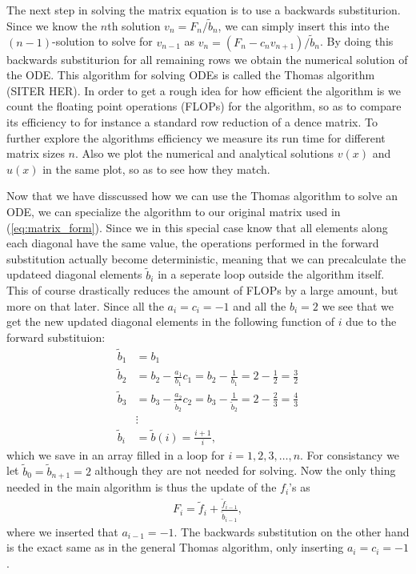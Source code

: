 \documentclass[twocolumn]{aastex62}
\begin{document}
The next step in solving the matrix equation is to use a backwards substiturion. Since we know the $n$th solution $v_n = F_n/\tilde{b}_n$, we can simply insert this into the $(n-1)$-solution to solve for $v_{n-1}$ as $v_{n} = (F_{n} - c_{n}v_{n+1})/ \tilde{b}_{n}$. By doing this backwards substiturion for all remaining rows we obtain the numerical solution of the ODE. This algorithm for solving ODEs is called the Thomas algorithm (SITER HER). In order to get a rough idea for how efficient the algorithm is we count the floating point operations (FLOPs) for the algorithm, so as to compare its efficiency to for instance a standard row reduction of a dence matrix. To further explore the algorithms efficiency we measure its run time for different matrix sizes $n$. Also we plot the numerical and analytical solutions $v(x)$ and $u(x)$ in the same plot, so as to see how they match. 

Now that we have disscussed how we can use the Thomas algorithm to solve an ODE, we can specialize the algorithm to our original matrix used in (\ref{eq:matrix_form}). Since we in this special case know that all elements along each diagonal have the same value, the operations performed in the forward substitution actually become deterministic, meaning that we can precalculate the updateed diagonal elements $\tilde{b}_i$ in a seperate loop outside the algorithm itself. This of course drastically reduces the amount of FLOPs by a large amount, but more on that later. Since all the $a_i = c_i = -1$ and all the $b_i = 2$ we see that we get the new updated diagonal elements in the following function of $i$ due to the forward substituion:
\begin{align}
	\tilde{b}_1 &= b_1\\
	\tilde{b}_2 &= b_2 - \frac{a_1}{b_1}c_1 = b_2 - \frac{1}{b_1} = 2 - \frac{1}{2} = \frac{3}{2}\\
	\tilde{b}_3 &= b_3 - \frac{a_2}{\tilde{b}_2}c_2 = b_3 - \frac{1}{\tilde{b}_2} = 2 - \frac{2}{3} = \frac{4}{3}\\
	&\vdots\\
	\tilde{b}_i &= \tilde{b}(i) = \frac{i + 1}{i},
\end{align} 
which we save in an array filled in a loop for $i = 1, 2, 3,\ldots, n$. For consistancy we let $\tilde{b}_0 = \tilde{b}_{n+1} = 2$ although they are not needed for solving. Now the only thing needed in the main algorithm is thus the update of the $f_i$'s as 
\begin{align}
	F_i = \tilde{f}_i + \frac{\tilde{f}_{i-1}}{\tilde{b}_{i-1}},
\end{align}
where we inserted that $a_{i-1} = -1$.
The backwards substitution on the other hand is the exact same as in the general Thomas algorithm, only inserting $a_i = c_i = -1$.
\end{document}
